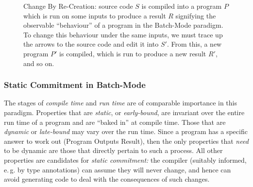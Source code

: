 \documentclass[ twoside,openright,titlepage,numbers=noenddot,headinclude,footinclude,cleardoublepage=empty,abstract=on,
                BCOR=5mm,paper=a4,fontsize=11pt
                ]{scrreprt}
\newcommand{\eg}{e.\,g.}
\theoremstyle{definition}
\begin{document}
\begin{figure}
 \caption[Change By Re-Creation]{Change By Re-Creation: source code $S$ is compiled into a program $P$ which is run on some inputs to produce a result $R$ signifying the observable ``behaviour'' of a program in the Batch-Mode paradigm. To change this behaviour under the same inputs, we must trace up the arrows to the source code and edit it into $S'$. From this, a new program $P'$ is compiled, which is run to produce a new result $R'$, and so on.}
\label{fig:change-by-re-creation}
\end{figure}

\hypertarget{static-commitment-in-batch-mode}{\subsubsection{Static Commitment in
Batch-Mode}\label{static-commitment-in-batch-mode}}

The stages of \emph{compile time} and \emph{run time} are of comparable
importance in this paradigm. Properties that are \emph{static}, or
\emph{early-bound}, are invariant over the entire run time of a program
and are ``baked in'' at compile time. Those that are \emph{dynamic} or
\emph{late-bound} may vary over the run time. Since a program has a
specific answer to work out (Program Outputs Result), then the only
properties that \emph{need} to be dynamic are those that directly
pertain to such a process. All other properties are candidates for
\emph{static commitment:} the compiler (suitably informed, \eg{} by type
annotations) can assume they will never change, and hence can avoid
generating code to deal with the consequences of such changes.
\end{document}
